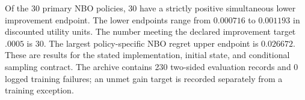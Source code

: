 Of the 30 primary NBO policies, 30 have a strictly positive simultaneous lower improvement endpoint. The lower endpoints range from $0.000716$ to $0.001193$ in discounted utility units. The number meeting the declared improvement target $.0005$ is 30. The largest policy-specific NBO regret upper endpoint is $0.026672$. These are results for the stated implementation, initial state, and conditional sampling contract. The archive contains 230 two-sided evaluation records and 0 logged training failures; an unmet gain target is recorded separately from a training exception.

